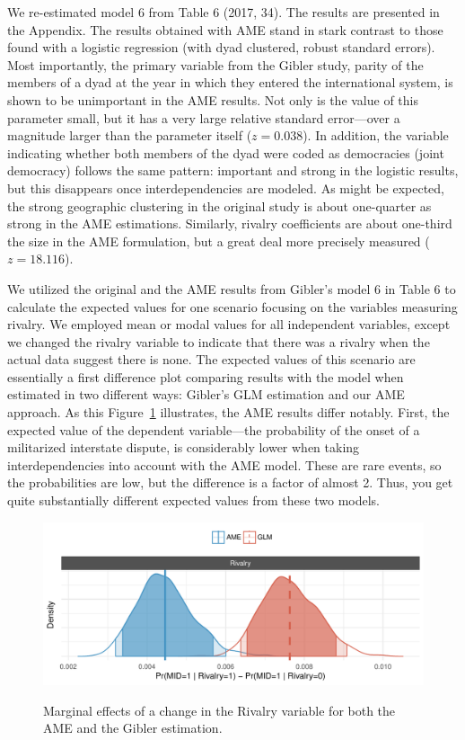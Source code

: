 \documentclass{article}[12pt]
\begin{document}
We re-estimated model 6 from Table 6 (2017, 34). The results are presented in the Appendix. The results obtained with AME stand in stark contrast to those found with a logistic regression (with dyad clustered, robust standard errors).  Most importantly, the primary variable from the Gibler study, parity of the members of a dyad at the year in which they entered the international system, is shown to be unimportant in the AME results.  Not only is the value of this parameter small, but it has a very large relative standard error---over a magnitude larger than the parameter itself ($z= 0.038$). In addition, the variable indicating whether both members of the dyad were coded as democracies (joint democracy) follows the same pattern: important and strong in the logistic results, but this disappears once interdependencies are modeled.  As might be expected, the strong geographic clustering in the original study is about one-quarter as strong in the AME estimations. Similarly, rivalry coefficients are about one-third the size in the AME formulation, but a great deal more precisely measured ($z=18.116$). 

We utilized the original and the AME results from Gibler's model 6 in Table 6 to calculate the expected values for one scenario focusing on the variables measuring rivalry.  We employed mean or modal values for all independent variables, except we changed the rivalry variable to indicate that there was a rivalry when the actual data suggest there is none.  The expected values of this scenario are essentially a first difference plot comparing results with the model when estimated in two different ways: Gibler's GLM estimation and our AME approach.  As this Figure~\ref{fig:gibmargeff} illustrates, the AME results differ notably. First, the expected value of the dependent variable---the probability of the onset of a militarized interstate dispute, is considerably lower when taking interdependencies into account with the AME model.  These are rare events, so the probabilities are low, but the difference is a factor of almost 2. Thus, you get quite substantially different expected values from these two models.  

\begin{figure}
	\caption{Marginal effects of a change in the Rivalry variable for both the AME and the Gibler estimation.  \label{fig:gibmargeff}}
	\includegraphics[width=\textwidth]{gibler_margeff.pdf}
 	\label{fig:gibmargeff}
 \end{figure}
\end{document}
